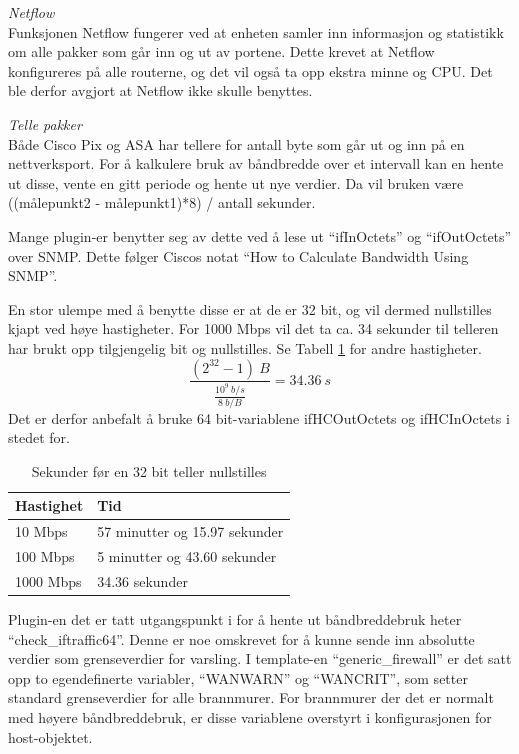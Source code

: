\textit{Netflow}
\\
Funksjonen Netflow\cite{ciscoiosnetflow} fungerer ved at enheten samler inn informasjon og statistikk om alle pakker som går inn og ut av portene. Dette krevet at Netflow konfigureres på alle routerne, og det vil også ta opp ekstra minne og CPU\cite{cisconetflowperf}. Det ble derfor avgjort at Netflow ikke skulle benyttes.

\textit{Telle pakker}
\\
Både Cisco Pix og ASA har tellere for antall byte som går ut og inn på en nettverksport. For å kalkulere bruk av båndbredde over et intervall kan en hente ut disse, vente en gitt periode og hente ut nye verdier. Da vil bruken være ((målepunkt2 - målepunkt1)*8) / antall sekunder.

Mange plugin-er benytter seg av dette ved å lese ut ``ifInOctets'' og ``ifOutOctets'' over SNMP. Dette følger Ciscos notat ``How to Calculate Bandwidth Using SNMP''\cite{ciscobandwidth}. 

En stor ulempe med å benytte disse er at de er 32 bit, og vil dermed nullstilles kjapt ved høye hastigheter. For 1000 Mbps vil det ta ca. 34 sekunder til telleren har brukt opp tilgjengelig bit og nullstilles. Se Tabell \ref{kalkulering_teller} for andre hastigheter.
\[\frac{(2^{32}-1)\:B}{\frac{10^9\:b/s}{8\:b/B}}=34.36\:s \] 
Det er derfor anbefalt å bruke 64 bit-variablene ifHCOutOctets og ifHCInOctets i stedet for\cite{ciscosnmpcounters}.
\begin{table}[H]
\begin{center}
\begin{tabular}{ | l | p{7cm} |} \hline
    \textbf{Hastighet} & \textbf{Tid} \\ \hline
    10 Mbps & 57 minutter og 15.97 sekunder \\ \hline
    100 Mbps & 5 minutter og 43.60 sekunder \\ \hline
    1000 Mbps & 34.36 sekunder \\ \hline
\end{tabular}
\caption{Sekunder før en 32 bit teller nullstilles }
\label{kalkulering_teller}
\end{center}
\end{table}
Plugin-en det er tatt utgangspunkt i for å hente ut båndbreddebruk heter ``check\_iftraffic64\cite{checkciscoif}''. Denne er noe omskrevet for å kunne sende inn absolutte verdier som grenseverdier for varsling. I template-en ``generic\_firewall'' er det satt opp to egendefinerte variabler, ``WANWARN'' og ``WANCRIT'', som setter standard grenseverdier for alle brannmurer. For brannmurer der det er normalt med høyere båndbreddebruk, er disse variablene overstyrt i konfigurasjonen for host-objektet.

